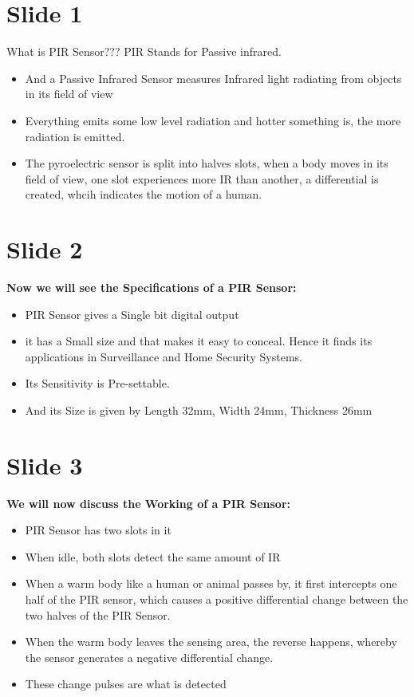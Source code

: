 \documentclass[a4paper,12 pt]{article}
\begin{document}
\section{Slide 1} 
What is PIR Sensor??? 
PIR Stands for Passive infrared. 
\begin{itemize}

\item  And a Passive Infrared Sensor measures Infrared light radiating from objects in its field of view
\item  Everything emits some low level radiation and hotter something is, the more radiation is emitted.	
\item  The pyroelectric sensor is split into halves slots, when a body moves in its field of view, one slot experiences more IR than another, a differential is created, whcih indicates the motion of a human.
\end{itemize}

\section{Slide 2}
\textbf{Now we will see the Specifications of a PIR Sensor:}
\begin{itemize}
\item PIR Sensor gives a Single bit digital output
\item it has a Small size and that makes it easy to conceal. Hence it finds its applications in Surveillance and Home Security Systems.
\item Its Sensitivity is Pre-settable.
\item And its Size is given by Length 32mm, Width 24mm, Thickness 26mm

\end{itemize}

\section{Slide 3}
\textbf{We will now discuss the Working of a PIR Sensor:}
		\begin{itemize}

\item  PIR Sensor has two slots in it
\item When idle, both slots detect the same amount of IR 
\item When a warm body like a human or animal passes by, it first intercepts one half of the PIR sensor, which causes a positive differential change between the two halves of the PIR Sensor.
\item When the warm body leaves the sensing area, the reverse happens, whereby the sensor generates a negative differential change.
\item These change pulses are what is detected
\end{itemize}
\end{document}
